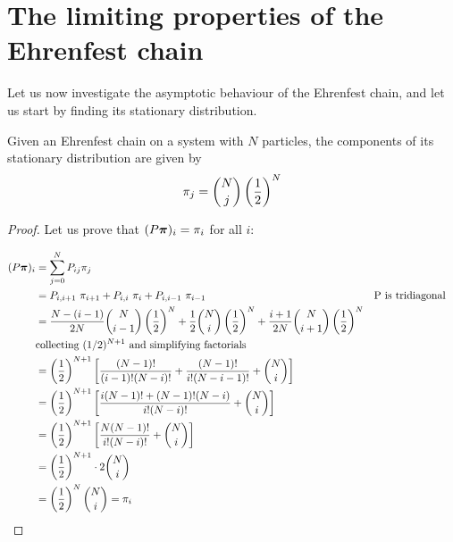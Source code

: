 \section{The limiting properties of the Ehrenfest chain}
Let us now investigate the asymptotic behaviour of the Ehrenfest chain, and let us start by finding its stationary distribution.

\begin{theorem}
    Given an Ehrenfest chain on a system with $N$ particles, the components of its stationary distribution are given by
    \begin{equation} \label{eq:ehrenfest_staz}
        \pi_j = {{N} \choose {j}} \left(\frac{1}{2} \right)^{N}
    \end{equation}
\end{theorem}
\begin{proof}
    Let us prove that $(P \boldsymbol{\pi})_i =\pi_i$ for all $i$:

        \begin{align}
            (P \boldsymbol{\pi})_i 
            & =  \sum_{j = 0}^N P_{ij} \pi_j \\
            & = P_{i,i+1}~\pi_{i+1} + P_{i,i}~\pi_i + P_{i,i-1}~\pi_{i-1} && \text{P is tridiagonal} \\
            & = \frac{N-(i-1)}{2N} {{N} \choose {i-1}} \left(\frac{1}{2} \right)^{N} + \frac{1}{2} {{N} \choose {i}} \left(\frac{1}{2} \right)^{N} + \frac{i+1}{2N} {{N} \choose {i+1}} \left(\frac{1}{2} \right)^{N} \\
            & \text{collecting $(1/2)^{N+1}$ and simplifying factorials} \\
            & = \left(\frac{1}{2} \right)^{N+1} \left[ \frac{(N-1)!}{(i-1)! (N-i)!} + \frac{(N-1)!}{i! (N-i-1)!} + {{N} \choose {i}} \right]\\
            & = \left(\frac{1}{2} \right)^{N+1} \left[ \frac{i (N-1)! + (N-1)! (N-i)}{i! (N-i)!} + {{N} \choose {i}} \right] \\
            & = \left(\frac{1}{2} \right)^{N+1} \left[ \frac{N (N-1)!}{i! (N-i)!} + {{N} \choose {i}} \right] \\
            & = \left(\frac{1}{2} \right)^{N+1} \cdot 2 {{N} \choose {i}}\\
            & = \left(\frac{1}{2} \right)^{N} {{N} \choose {i}} = \pi_i 
        \end{align}
\end{proof}